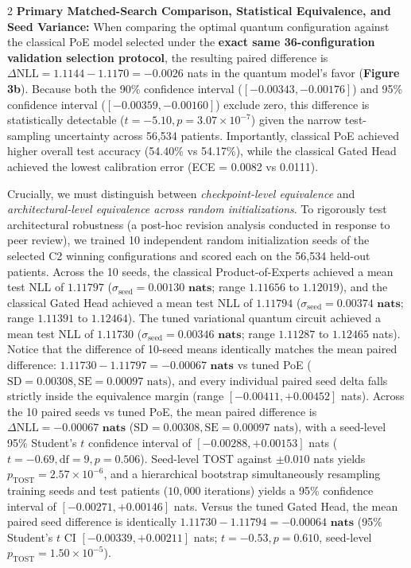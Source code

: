 \documentclass[10pt,a4paper,twoside]{article}
\begin{document}
\begin{multicols}{2}
\noindent\textbf{Primary Matched-Search Comparison, Statistical Equivalence, and Seed Variance:} When comparing the optimal quantum configuration against the classical PoE model selected under the \textbf{exact same 36-configuration validation selection protocol}, the resulting paired difference is $\Delta\text{NLL} = 1.1144 - 1.1170 = \mathbf{-0.0026}$ nats in the quantum model's favor (\textbf{Figure 3b}). Because both the 90\% confidence interval ($[-0.00343, -0.00176]$) and 95\% confidence interval ($[-0.00359, -0.00160]$) exclude zero, this difference is statistically detectable ($t = -5.10, p = 3.07 \times 10^{-7}$) given the narrow test-sampling uncertainty across 56,534 patients. Importantly, classical PoE achieved higher overall test accuracy (54.40\% vs 54.17\%), while the classical Gated Head achieved the lowest calibration error (ECE = 0.0082 vs 0.0111).

Crucially, we must distinguish between \textit{checkpoint-level equivalence} and \textit{architectural-level equivalence across random initializations}. To rigorously test architectural robustness (a post-hoc revision analysis conducted in response to peer review), we trained 10 independent random initialization seeds of the selected C2 winning configurations and scored each on the 56,534 held-out patients. Across the 10 seeds, the classical Product-of-Experts achieved a mean test NLL of $1.11797$ ($\sigma_{\text{seed}} = \mathbf{0.00130\text{ nats}}$; range $1.11656$ to $1.12019$), and the classical Gated Head achieved a mean test NLL of $1.11794$ ($\sigma_{\text{seed}} = \mathbf{0.00374\text{ nats}}$; range $1.11391$ to $1.12464$). The tuned variational quantum circuit achieved a mean test NLL of $1.11730$ ($\sigma_{\text{seed}} = \mathbf{0.00346\text{ nats}}$; range $1.11287$ to $1.12465$ nats). Notice that the difference of 10-seed means identically matches the mean paired difference: $1.11730 - 1.11797 = \mathbf{-0.00067\text{ nats}}$ vs tuned PoE ($\text{SD} = 0.00308, \text{SE} = 0.00097\text{ nats}$), and every individual paired seed delta falls strictly inside the equivalence margin (range $[-0.00411, +0.00452]$ nats). Across the 10 paired seeds vs tuned PoE, the mean paired difference is $\Delta\text{NLL} = \mathbf{-0.00067\text{ nats}}$ ($\text{SD} = 0.00308, \text{SE} = 0.00097\text{ nats}$), with a seed-level 95\% Student's $t$ confidence interval of $[-0.00288, +0.00153]$ nats ($t = -0.69, \text{df} = 9, p = 0.506$). Seed-level TOST against $\pm 0.010$ nats yields $p_{\text{TOST}} = 2.57 \times 10^{-6}$, and a hierarchical bootstrap simultaneously resampling training seeds and test patients ($10,000$ iterations) yields a 95\% confidence interval of $[-0.00271, +0.00146]$ nats. Versus the tuned Gated Head, the mean paired seed difference is identically $1.11730 - 1.11794 = \mathbf{-0.00064\text{ nats}}$ (95\% Student's $t$ CI $[-0.00339, +0.00211]$ nats; $t = -0.53, p = 0.610$, seed-level $p_{\text{TOST}} = 1.50 \times 10^{-5}$).


\end{multicols}
\end{document}
